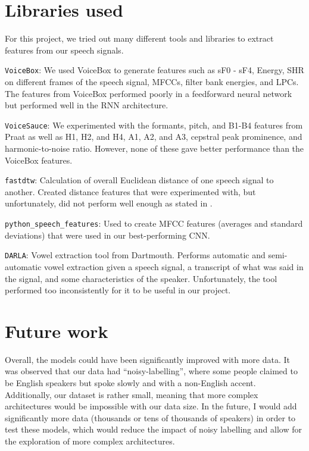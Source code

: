 \documentclass{article}
\begin{document}
\section{Libraries used}
\label{sec:libraries}

For this project, we tried out many different tools and libraries to extract features from our speech signals.

\texttt{VoiceBox}: We used VoiceBox to generate features such as sF0 - sF4, Energy, SHR on different frames of the speech signal, MFCCs, filter bank energies, and LPCs.
The features from VoiceBox performed poorly in a  feedforward neural network but performed well in the RNN architecture.

\texttt{VoiceSauce}: We experimented with the formants, pitch, and B1-B4 features from Praat as well as H1, H2, and H4, A1, A2, and A3, cepstral peak prominence, and harmonic-to-noise ratio.
However, none of these gave better performance than the VoiceBox features.

\texttt{fastdtw}: Calculation of overall Euclidean distance of one speech signal to another.
Created distance features that were experimented with, but unfortunately, did not perform well enough as stated in .

\texttt{python\_speech\_features}: Used to create MFCC features (averages and standard deviations) that were used in our best-performing CNN.

\texttt{DARLA}: Vowel extraction tool from Dartmouth.
Performs automatic and semi-automatic vowel extraction given a speech signal, a transcript of what was said in the signal, and some characteristics of the speaker.
Unfortunately, the tool performed too inconsistently for it to be useful in our project.

\section{Future work}
\label{sec:future}

Overall, the models could have been significantly improved with more data.
It was observed that our data had “noisy-labelling”, where some people claimed to be English speakers but spoke slowly and with a non-English accent.
Additionally, our dataset is rather small, meaning that more complex architectures would be impossible with our data size.
In the future, I would add significantly more data (thousands or tens of thousands of speakers) in order to test these models, which would reduce the impact of noisy labelling and allow for the exploration of more complex architectures.
\end{document}
